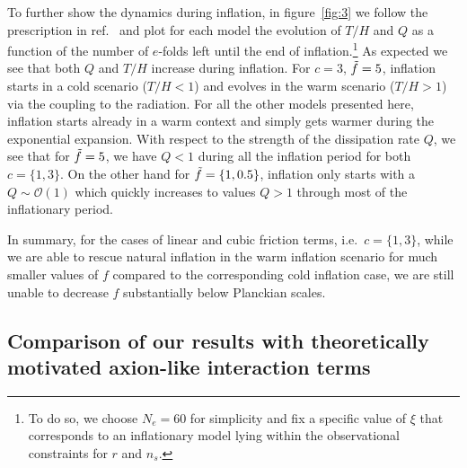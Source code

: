 \documentclass[a4paper,11pt]{article}
\begin{document}
To further show the dynamics during inflation, in figure~\ref{fig:3} we follow the prescription in ref.~\cite{Reyimuaji:2020bkm} and plot for each model the evolution of $T/H$ and $Q$ as a function of the number of $e$-folds left until the end of inflation.\footnote{To do so, we choose $N_e=60$ for simplicity and fix a specific value of $\xi$ that corresponds to an inflationary model lying within the observational constraints for $r$ and $n_s$.} As expected we see that both $Q$ and $T/H$ increase during inflation. For $c=3$, $\Tilde{f}=5$, inflation starts in a cold scenario ($T/H<1$) and evolves in the warm scenario ($T/H>1$) via the coupling to the radiation. For all the other models presented here, inflation starts already in a warm context and simply gets warmer during the exponential expansion. With respect to the strength of the dissipation rate $Q$, we see that for $\Tilde{f}=5$, we have $Q<1$ during all the inflation period for both $c=\{1,3\}$. On the other hand for $\Tilde{f}=\{1,0.5\}$, inflation only starts with a $Q\sim \mathcal{O}(1)$ which quickly increases to values $Q>1$ through most of the inflationary period.

In summary, for the cases of linear and cubic friction terms, i.e.\ $c=\{1,3\}$, while we are able to rescue natural inflation in the warm inflation scenario for much smaller values of $f$ compared to the corresponding cold inflation case, we are still unable to decrease $f$ substantially below Planckian scales.

\subsection{Comparison of our results with theoretically motivated axion-like interaction terms
}\label{sec:4.2}
\end{document}
